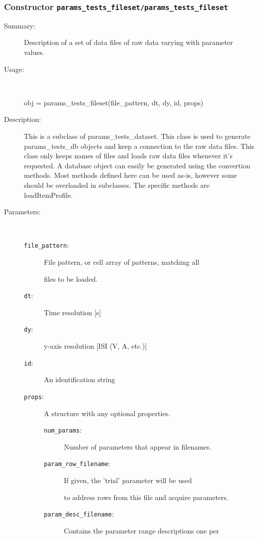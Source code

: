 \subsubsection[Constructor \texttt{params\_tests\_fileset}]{Constructor \texttt{params\_tests\_fileset/params\_tests\_fileset}}%
%
\label{ref_params_tests_fileset__params_tests_fileset}%
\hypertarget{ref_params_tests_fileset__params_tests_fileset}{}%
\begin{description}
\item[Summary:]Description of a set of data files of raw data varying with parameter values.
%
\item[Usage:]~%
\begin{lyxcode}%
obj = params\_tests\_fileset(file\_pattern, dt, dy, id, props)
%
\end{lyxcode}%
%
\item[Description:]%
This is a subclass of params\_tests\_dataset. This class is used to generate 
 params\_tests\_db objects and keep 
 a connection to the raw data files. This class only keeps names of
 files and loads raw data files whenever it's requested. A database
 object can easily be generated using the convertion methods.
 Most methods defined here can 
 be used as-is, however some should be overloaded in subclasses. 
 The specific methods are loadItemProfile.
\item[Parameters:]~
\begin{description}%
\item[\texttt{file\_pattern}:]
 File pattern, or cell array of patterns, matching all 

files to be loaded.\item[\texttt{dt}:]
 Time resolution [s]
\item[\texttt{dy}:]
 y-axis resolution [ISI (V, A, etc.)]
\item[\texttt{id}:]
 An identification string
\item[\texttt{props}:]
 A structure with any optional properties.
\begin{description}%
\item[\texttt{num\_params}:]
 Number of parameters that appear in filenames.
\item[\texttt{param\_row\_filename}:]
 If given, the 'trial' parameter will be used

to address rows from this file and acquire parameters.\item[\texttt{param\_desc\_filename}:]
 Contains the parameter range descriptions one per 


\end{description}
\end{description}
\end{description}
